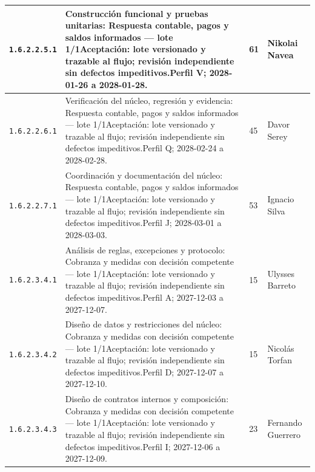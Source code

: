 \begin{longtable}{L{29mm}L{80mm}R{12mm}L{28mm}}
\texttt{1.\allowbreak{}6.\allowbreak{}2.\allowbreak{}2.\allowbreak{}5.\allowbreak{}1} & Construcción funcional y pruebas unitarias: Respuesta contable, pagos y saldos informados — lote 1/1\newline Aceptación: lote versionado y trazable al flujo; revisión independiente sin defectos impeditivos.\newline Perfil V; 2028-01-26 a 2028-01-28. & 61 & Nikolai Navea\\\hline
\texttt{1.\allowbreak{}6.\allowbreak{}2.\allowbreak{}2.\allowbreak{}6.\allowbreak{}1} & Verificación del núcleo, regresión y evidencia: Respuesta contable, pagos y saldos informados — lote 1/1\newline Aceptación: lote versionado y trazable al flujo; revisión independiente sin defectos impeditivos.\newline Perfil Q; 2028-02-24 a 2028-02-28. & 45 & Davor Serey\\\hline
\texttt{1.\allowbreak{}6.\allowbreak{}2.\allowbreak{}2.\allowbreak{}7.\allowbreak{}1} & Coordinación y documentación del núcleo: Respuesta contable, pagos y saldos informados — lote 1/1\newline Aceptación: lote versionado y trazable al flujo; revisión independiente sin defectos impeditivos.\newline Perfil J; 2028-03-01 a 2028-03-03. & 53 & Ignacio Silva\\\hline
\texttt{1.\allowbreak{}6.\allowbreak{}2.\allowbreak{}3.\allowbreak{}4.\allowbreak{}1} & Análisis de reglas, excepciones y protocolo: Cobranza y medidas con decisión competente — lote 1/1\newline Aceptación: lote versionado y trazable al flujo; revisión independiente sin defectos impeditivos.\newline Perfil A; 2027-12-03 a 2027-12-07. & 15 & Ulysses Barreto\\\hline
\texttt{1.\allowbreak{}6.\allowbreak{}2.\allowbreak{}3.\allowbreak{}4.\allowbreak{}2} & Diseño de datos y restricciones del núcleo: Cobranza y medidas con decisión competente — lote 1/1\newline Aceptación: lote versionado y trazable al flujo; revisión independiente sin defectos impeditivos.\newline Perfil D; 2027-12-07 a 2027-12-10. & 15 & Nicolás Torfan\\\hline
\texttt{1.\allowbreak{}6.\allowbreak{}2.\allowbreak{}3.\allowbreak{}4.\allowbreak{}3} & Diseño de contratos internos y composición: Cobranza y medidas con decisión competente — lote 1/1\newline Aceptación: lote versionado y trazable al flujo; revisión independiente sin defectos impeditivos.\newline Perfil I; 2027-12-06 a 2027-12-09. & 23 & Fernando Guerrero\\\hline

\end{longtable}
